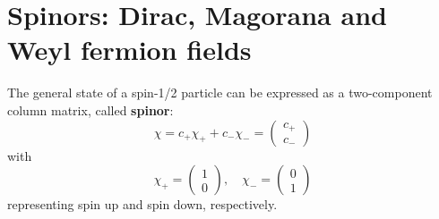 \documentclass[12pt]{report}
\begin{document}
\section{Spinors: Dirac, Magorana and Weyl fermion fields}
The general state of a spin-1/2 particle can be expressed as a two-component column matrix, called \textbf{spinor}:
\begin{equation}
\chi = c_{+} \chi_{+} + c_{-} \chi_{-} = \left(\begin{array}{c}c_{+} \\c_{-}\end{array}\right)
\end{equation}
with
\begin{equation}
\chi_{+} = \left(\begin{array}{c}1 \\0\end{array}\right), \quad 
\chi_{-} = \left(\begin{array}{c}0 \\1\end{array}\right)
\end{equation}
representing spin up and spin down, respectively.
\end{document}
